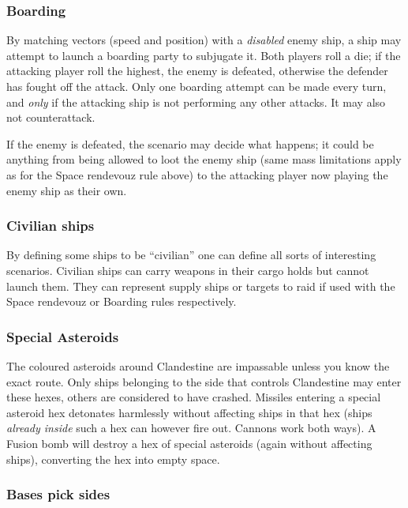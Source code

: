 \documentclass[a4paper,12pt,notitlepage,twocolumn]{article}
\begin{document}
\subsubsection*{Boarding}

By matching vectors (speed and position) with a \emph{disabled} enemy ship, a ship may
attempt to launch a boarding party to subjugate it. Both players roll
a die; if the attacking player roll the highest, the enemy is
defeated, otherwise the defender has fought off the attack. Only one
boarding attempt can be made every turn, and \emph{only} if the
attacking ship is not performing any other attacks. It may also not
counterattack. 

If the enemy is defeated, the scenario may decide what happens; it
could be anything from being allowed to loot the enemy ship (same mass
limitations apply as for the Space rendevouz rule above) to the
attacking player now playing the enemy ship as their own. 

\subsubsection*{Civilian ships}

By defining some ships to be ``civilian'' one can define all sorts of
interesting scenarios. Civilian ships can carry weapons in their cargo
holds but cannot launch them. They can represent supply
ships or targets to raid if used with the Space rendevouz or Boarding
rules respectively. 

\subsubsection*{Special Asteroids}

The coloured asteroids around Clandestine are impassable unless you
know the exact route. Only ships belonging to the side that controls
Clandestine may enter these hexes, others are considered to have
crashed. Missiles entering a special asteroid hex detonates harmlessly
without affecting ships in that hex (ships \emph{already inside} such a hex can
however fire out. Cannons work both ways). A Fusion bomb will destroy a hex
of special asteroids (again without affecting ships), converting the
hex into empty space. 

\subsubsection*{Bases pick sides}
\end{document}
